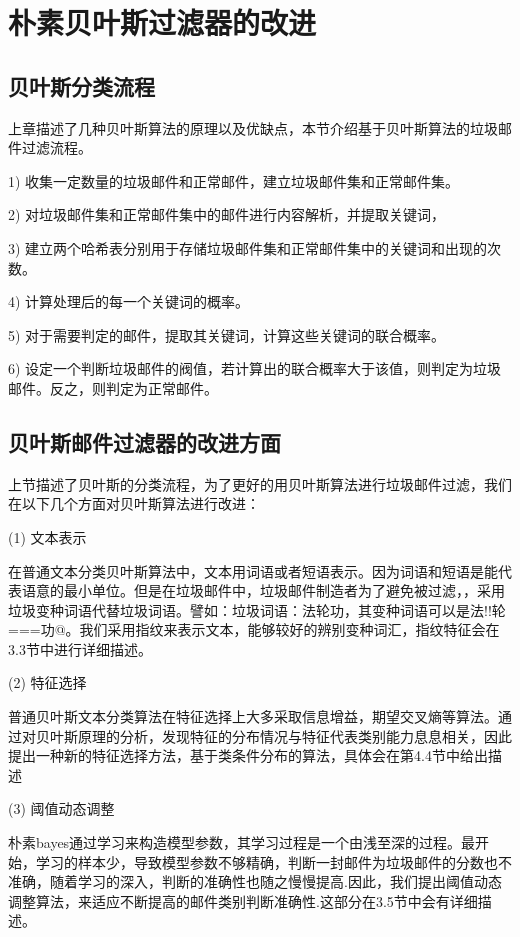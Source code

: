 \chapter{朴素贝叶斯过滤器的改进}

\section{贝叶斯分类流程}
上章描述了几种贝叶斯算法的原理以及优缺点，本节介绍基于贝叶斯算法的垃圾邮件过滤流程。

1) 收集一定数量的垃圾邮件和正常邮件，建立垃圾邮件集和正常邮件集。

2) 对垃圾邮件集和正常邮件集中的邮件进行内容解析，并提取关键词，

3) 建立两个哈希表分别用于存储垃圾邮件集和正常邮件集中的关键词和出现的次数。

4) 计算处理后的每一个关键词的概率。

5) 对于需要判定的邮件，提取其关键词，计算这些关键词的联合概率。

6) 设定一个判断垃圾邮件的阀值，若计算出的联合概率大于该值，则判定为垃圾邮件。反之，则判定为正常邮件。

\section{贝叶斯邮件过滤器的改进方面}
上节描述了贝叶斯的分类流程，为了更好的用贝叶斯算法进行垃圾邮件过滤，我们在以下几个方面对贝叶斯算法进行改进：

(1)	文本表示

在普通文本分类贝叶斯算法中，文本用词语或者短语表示。因为词语和短语是能代表语意的最小单位。但是在垃圾邮件中，垃圾邮件制造者为了避免被过滤，，采用垃圾变种词语代替垃圾词语。譬如：垃圾词语：法轮功，其变种词语可以是法!!轮===功@。我们采用指纹来表示文本，能够较好的辨别变种词汇，指纹特征会在3.3节中进行详细描述。

(2)	特征选择

普通贝叶斯文本分类算法在特征选择上大多采取信息增益，期望交叉熵等算法。通过对贝叶斯原理的分析，发现特征的分布情况与特征代表类别能力息息相关，因此提出一种新的特征选择方法，基于类条件分布的算法，具体会在第4.4节中给出描述

(3)	 阈值动态调整

朴素bayes通过学习来构造模型参数，其学习过程是一个由浅至深的过程。最开始，学习的样本少，导致模型参数不够精确，判断一封邮件为垃圾邮件的分数也不准确，随着学习的深入，判断的准确性也随之慢慢提高.因此，我们提出阈值动态调整算法，来适应不断提高的邮件类别判断准确性.这部分在3.5节中会有详细描述。

